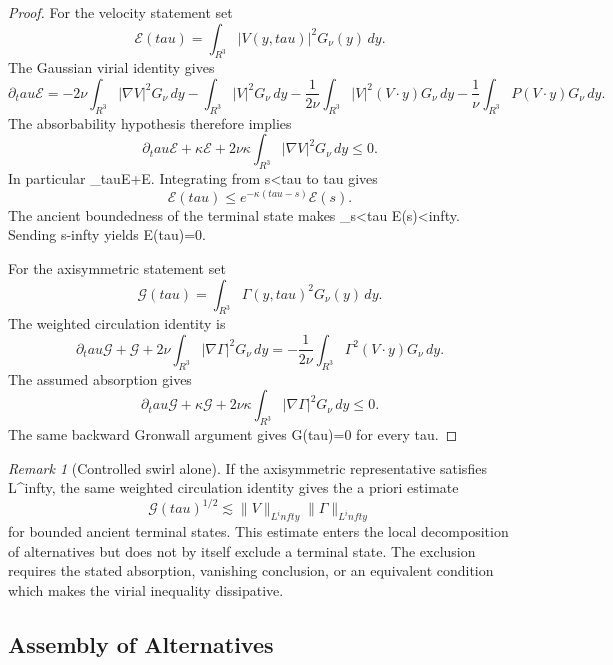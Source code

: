 \documentclass[11pt]{amsart}
\def\({}%
\def\){}%
\def\mathbb#1{#1}%
\def\tau{tau}%
\def\infty{infty}%
\theoremstyle{plain}
\theoremstyle{definition}
\theoremstyle{remark}
\newtheorem{remark}[theorem]{Remark}
\begin{document}
\begin{proof}
For the velocity statement set
\[
  \mathcal E(\tau)=\int_{\mathbb R^3}|V(y,\tau)|^2G_\nu(y)\,dy .
\]
The Gaussian virial identity gives
\[
  \partial_\tau\mathcal E
  =
  -2\nu\int_{\mathbb R^3}|\nabla V|^2G_\nu\,dy
  -\int_{\mathbb R^3}|V|^2G_\nu\,dy
  -\frac{1}{2\nu}\int_{\mathbb R^3}|V|^2(V\cdot y)G_\nu\,dy
  -\frac1\nu\int_{\mathbb R^3}P(V\cdot y)G_\nu\,dy .
\]
The absorbability hypothesis therefore implies
\[
  \partial_\tau\mathcal E
  +\kappa\mathcal E
  +2\nu\kappa\int_{\mathbb R^3}|\nabla V|^2G_\nu\,dy
  \le0 .
\]
In particular \(\partial_\tau\mathcal E+\kappa\mathcal E\).  Integrating
from \(s<\tau\) to \(\tau\) gives
\[
  \mathcal E(\tau)\le e^{-\kappa(\tau-s)}\mathcal E(s).
\]
The ancient boundedness of the terminal state makes \(\sup_{s<\tau}\mathcal
E(s)<\infty\).  Sending \(s\to-\infty\) yields \(\mathcal E(\tau)=0\).

For the axisymmetric statement set
\[
  \mathcal G(\tau)=\int_{\mathbb R^3}\Gamma(y,\tau)^2G_\nu(y)\,dy .
\]
The weighted circulation identity is
\[
  \partial_\tau\mathcal G
  +\mathcal G
  +2\nu\int_{\mathbb R^3}|\nabla\Gamma|^2G_\nu\,dy
  =
  -\frac{1}{2\nu}\int_{\mathbb R^3}\Gamma^2(V\cdot y)G_\nu\,dy .
\]
The assumed absorption gives
\[
  \partial_\tau\mathcal G+\kappa\mathcal G
  +2\nu\kappa\int_{\mathbb R^3}|\nabla\Gamma|^2G_\nu\,dy
  \le0 .
\]
The same backward Gronwall argument gives \(\mathcal G(\tau)=0\) for every
\(\tau\).
\end{proof}

\begin{remark}[Controlled swirl alone]
\label{paper6:rem:controlled-swirl}
If the axisymmetric representative satisfies \(\Gamma\in L^\infty\), the same
weighted circulation identity gives the a priori estimate
\[
  \mathcal G(\tau)^{1/2}
  \lesssim
  \|V\|_{L^\infty}\|\Gamma\|_{L^\infty}
\]
for bounded ancient terminal states.  This estimate enters the local
decomposition of alternatives but does not by itself exclude a terminal state.  The exclusion
requires the stated absorption, vanishing conclusion, or an equivalent
condition which makes the virial inequality dissipative.
\end{remark}

\subsection{Assembly of Alternatives}
\end{document}

